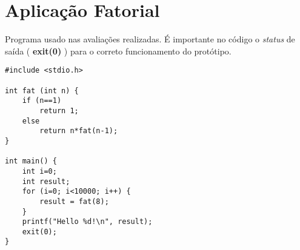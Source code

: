 \chapter{Aplicação Fatorial}
\label{anexo:fatorial}

Programa usado nas avaliações realizadas. É importante no código o \emph{status} de saída ( \textbf{exit(0)} ) para o correto funcionamento do protótipo.

\begin{scriptsize}
\begin{verbatim}
#include <stdio.h>
	
int fat (int n) {
    if (n==1)
        return 1;
    else
        return n*fat(n-1);
}

int main() {
    int i=0;
    int result;
    for (i=0; i<10000; i++) {
        result = fat(8);
    }
    printf("Hello %d!\n", result);
    exit(0);
}
\end{verbatim}
\end{scriptsize}
